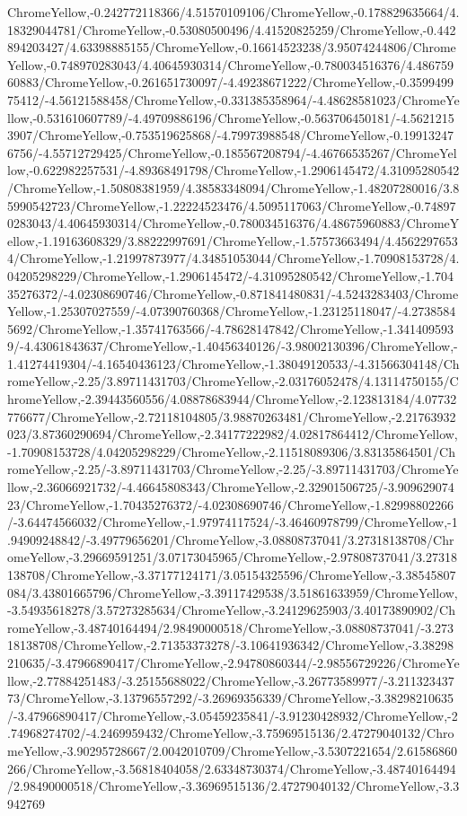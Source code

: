 {\begin{tikzternal}
ChromeYellow,-0.242772118366/4.51570109106/ChromeYellow,-0.178829635664/4.18329044781/ChromeYellow,-0.53080500496/4.41520825259/ChromeYellow,-0.442894203427/4.63398885155/ChromeYellow,-0.16614523238/3.95074244806/ChromeYellow,-0.748970283043/4.40645930314/ChromeYellow,-0.780034516376/4.48675960883/ChromeYellow,-0.261651730097/-4.49238671222/ChromeYellow,-0.359949975412/-4.56121588458/ChromeYellow,-0.331385358964/-4.48628581023/ChromeYellow,-0.531610607789/-4.49709886196/ChromeYellow,-0.563706450181/-4.56212153907/ChromeYellow,-0.753519625868/-4.79973988548/ChromeYellow,-0.199132476756/-4.55712729425/ChromeYellow,-0.185567208794/-4.46766535267/ChromeYellow,-0.622982257531/-4.89368491798/ChromeYellow,-1.2906145472/4.31095280542/ChromeYellow,-1.50808381959/4.38583348094/ChromeYellow,-1.48207280016/3.85990542723/ChromeYellow,-1.22224523476/4.5095117063/ChromeYellow,-0.748970283043/4.40645930314/ChromeYellow,-0.780034516376/4.48675960883/ChromeYellow,-1.19163608329/3.88222997691/ChromeYellow,-1.57573663494/4.45622976534/ChromeYellow,-1.21997873977/4.34851053044/ChromeYellow,-1.70908153728/4.04205298229/ChromeYellow,-1.2906145472/-4.31095280542/ChromeYellow,-1.70435276372/-4.02308690746/ChromeYellow,-0.871841480831/-4.5243283403/ChromeYellow,-1.25307027559/-4.07390760368/ChromeYellow,-1.23125118047/-4.27385845692/ChromeYellow,-1.35741763566/-4.78628147842/ChromeYellow,-1.3414095939/-4.43061843637/ChromeYellow,-1.40456340126/-3.98002130396/ChromeYellow,-1.41274419304/-4.16540436123/ChromeYellow,-1.38049120533/-4.31566304148/ChromeYellow,-2.25/3.89711431703/ChromeYellow,-2.03176052478/4.13114750155/ChromeYellow,-2.39443560556/4.08878683944/ChromeYellow,-2.123813184/4.07732776677/ChromeYellow,-2.72118104805/3.98870263481/ChromeYellow,-2.21763932023/3.87360290694/ChromeYellow,-2.34177222982/4.02817864412/ChromeYellow,-1.70908153728/4.04205298229/ChromeYellow,-2.11518089306/3.83135864501/ChromeYellow,-2.25/-3.89711431703/ChromeYellow,-2.25/-3.89711431703/ChromeYellow,-2.36066921732/-4.46645808343/ChromeYellow,-2.32901506725/-3.90962907423/ChromeYellow,-1.70435276372/-4.02308690746/ChromeYellow,-1.82998802266/-3.64474566032/ChromeYellow,-1.97974117524/-3.46460978799/ChromeYellow,-1.94909248842/-3.49779656201/ChromeYellow,-3.08808737041/3.27318138708/ChromeYellow,-3.29669591251/3.07173045965/ChromeYellow,-2.97808737041/3.27318138708/ChromeYellow,-3.37177124171/3.05154325596/ChromeYellow,-3.38545807084/3.43801665796/ChromeYellow,-3.39117429538/3.51861633959/ChromeYellow,-3.54935618278/3.57273285634/ChromeYellow,-3.24129625903/3.40173890902/ChromeYellow,-3.48740164494/2.98490000518/ChromeYellow,-3.08808737041/-3.27318138708/ChromeYellow,-2.71353373278/-3.10641936342/ChromeYellow,-3.38298210635/-3.47966890417/ChromeYellow,-2.94780860344/-2.98556729226/ChromeYellow,-2.77884251483/-3.25155688022/ChromeYellow,-3.26773589977/-3.21132343773/ChromeYellow,-3.13796557292/-3.26969356339/ChromeYellow,-3.38298210635/-3.47966890417/ChromeYellow,-3.05459235841/-3.91230428932/ChromeYellow,-2.74968274702/-4.2469959432/ChromeYellow,-3.75969515136/2.47279040132/ChromeYellow,-3.90295728667/2.0042010709/ChromeYellow,-3.5307221654/2.61586860266/ChromeYellow,-3.56818404058/2.63348730374/ChromeYellow,-3.48740164494/2.98490000518/ChromeYellow,-3.36969515136/2.47279040132/ChromeYellow,-3.3942769
\end{tikzternal}}
